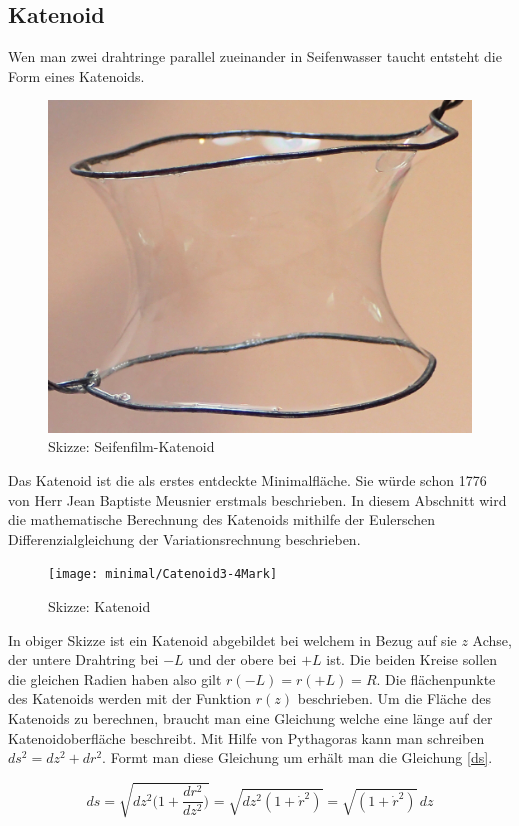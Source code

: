 \begin{refsection}
\subsection{Katenoid}
Wen man zwei drahtringe parallel zueinander in Seifenwasser taucht entsteht die Form eines Katenoids. 
\begin{figure}[H]
  \centering
  \includegraphics[scale=0.5]{minimal/Cartenoid_Foto.png}
  \caption{Skizze: Seifenfilm-Katenoid} 
\end{figure}
Das Katenoid ist die als erstes entdeckte Minimalfläche.
Sie würde schon 1776 von Herr Jean Baptiste Meusnier erstmals beschrieben.
In diesem Abschnitt wird die mathematische Berechnung des Katenoids mithilfe der Eulerschen Differenzialgleichung der Variationsrechnung beschrieben.
\begin{figure}[H]
  \centering
  \texttt{[image: minimal/Catenoid3-4Mark]}
  \caption{Skizze: Katenoid} 
\end{figure}
In obiger Skizze ist ein Katenoid abgebildet bei welchem in Bezug auf sie $z$ Achse, der untere Drahtring bei $-L$ und der obere bei $+L$ ist. 
Die beiden Kreise sollen die gleichen Radien haben also gilt $r(-L)=r(+L)=R$. Die flächenpunkte des Katenoids werden mit der Funktion $r(z)$ beschrieben. 
Um die Fläche des Katenoids zu berechnen, braucht man eine Gleichung welche eine länge auf der Katenoidoberfläche beschreibt. Mit Hilfe von Pythagoras kann man schreiben $ds^2=dz^2+dr^2$.
Formt man diese Gleichung um erhält man die Gleichung \eqref{ds}.

\begin{equation} \label{ds}
  ds=\sqrt{dz^2\bigg(1+\frac{dr^2}{dz^2}\bigg)}= \sqrt{dz^2(1+\dot r^2)}=\sqrt{(1+\dot r^2)}\,dz
\end{equation}

\end{refsection}

